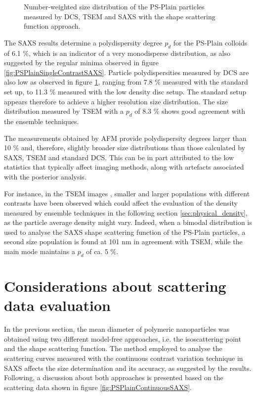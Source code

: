 \begin{figure}
	\begin{center}
		
	\end{center}
	\caption[Number-weighted size distribution of the PS-Plain particles.]{Number-weighted size distribution of the PS-Plain particles measured by DCS, TSEM \citep{nicolet_inter-laboratory_2016} and SAXS with the shape scattering function approach.}
	\label{fig:PSPlainSizeDistribution}
\end{figure}

The SAXS results determine a polydispersity degree $p_d$ for the PS-Plain colloids of 6.1 $\%$, which is an indicator of a very monodisperse distribution, as also suggested by the regular minima observed in figure \ref{fig:PSPlainSingleContrastSAXS}. Particle polydispersities measured by DCS are also low as observed in figure \ref{fig:PSPlainSizeDistribution}, ranging from 7.8 $\%$ measured with the standard set up, to 11.3 $\%$ measured with the low density disc setup. The standard setup appears therefore to achieve a higher resolution size distribution. The size distribution measured by TSEM with a $p_d$ of 8.3 $\%$ shows good agreement with the ensemble techniques.

The measurements obtained by AFM provide polydispersity degrees larger than 10 $\%$ \citep{nicolet_inter-laboratory_2016} and, therefore, slightly broader size distributions than those calculated by SAXS, TSEM and standard DCS. This can be in part attributed to the low statistics that typically affect imaging methods, along with artefacts associated with the posterior analysis.

For instance, in the TSEM images \citep{nicolet_inter-laboratory_2016}, smaller and larger populations with different contrasts have been observed which could affect the evaluation of the density measured by ensemble techniques in the following section \ref{sec:physical_density}, as the particle average density might vary. Indeed, when a bimodal distribution is used to analyse the SAXS shape scattering function of the PS-Plain particles, a second size population is found at 101 nm in agreement with TSEM, while the main mode maintains a $p_d$ of ca. 5 $\%$.

\section{Considerations about scattering data evaluation}

In the previous section, the mean diameter of polymeric nanoparticles was obtained using two different model-free approaches, i.e. the isoscattering point and the shape scattering function. The method employed to analyse the scattering curves measured with the continuous contrast variation technique in SAXS affects the size determination and its accuracy, as suggested by the results. Following, a discussion about both approaches is presented based on the scattering data shown in figure \ref{fig:PSPlainContinuousSAXS}.

